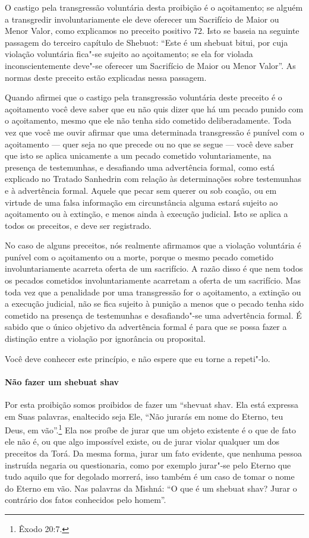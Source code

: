 \begin{multicols}{2}
O castigo pela transgressão voluntária desta proibição é o açoitamento; se alguém a transgredir involuntariamente ele deve oferecer um
Sacrifício de Maior ou Menor Valor, como explicamos no preceito
positivo 72. Isto se baseia na seguinte passagem do terceiro capítulo de
Shebuot\starr: ``Este é um shebuat bitui\starr, por cuja violação voluntária
fica"-se sujeito ao açoitamento; se ela for violada inconscientemente
deve"-se oferecer um Sacrifício de Maior ou Menor Valor''. As normas
deste preceito estão explicadas nessa passagem.

Quando afirmei que o castigo pela transgressão voluntária deste preceito
é o açoitamento você deve saber que eu não quis dizer que há um pecado
punido com o açoitamento, mesmo que ele não tenha sido cometido
deliberadamente. Toda vez que você me ouvir afirmar que uma determinada
transgressão é punível com o açoitamento --- quer seja no que precede
ou no que se segue --- você deve saber que isto se aplica unicamente a
um pecado cometido voluntariamente, na presença de testemunhas, e
desafiando uma advertência formal, como está explicado no Tratado
Sanhedrin\starr{} com relação às determinações sobre testemunhas e à
advertência formal. Aquele que pecar sem querer ou sob coação, ou em
virtude de uma falsa informação em circunstância alguma estará sujeito
ao açoitamento ou à extinção, e menos ainda à execução judicial. Isto
se aplica a todos os preceitos, e deve ser registrado.

No caso de alguns preceitos, nós realmente afirmamos que a violação
voluntária é punível com o açoitamento ou a morte, porque o mesmo
pecado cometido involuntariamente acarreta oferta de um sacrifício. A
razão disso é que nem todos os pecados cometidos involuntariamente
acarretam a oferta de um sacrifício. Mas toda vez que a penalidade por
uma transgressão for o açoitamento, a extinção ou a execução judicial,
não se fica sujeito à punição a menos que o pecado tenha sido cometido
na presença de testemunhas e desafiando"-se uma advertência formal. É
sabido que o único objetivo da advertência formal é para que se possa
fazer a distinção entre a violação por ignorância ou proposital.

Você deve conhecer este princípio, e não espere que eu torne a repeti"-lo.

\paragraph{Não fazer um shebuat shav\starr}

Por esta proibição somos proibidos de fazer um ``shevuat shav\starr.
Ela está expressa em Suas palavras, enaltecido seja
Ele, ``Não jurarás em nome do Eterno, teu Deus, em vão''.\footnote{Êxodo 20:7.}
Ela nos proíbe de jurar que um objeto existente é o que de fato ele não
é, ou que algo impossível existe, ou de jurar violar qualquer um dos
preceitos da Torá\starr. Da mesma forma, jurar um fato evidente, que nenhuma
pessoa instruída negaria ou questionaria, como por exemplo jurar"-se
pelo Eterno que tudo aquilo que for degolado morrerá, isso também é um
caso de tomar o nome do Eterno em vão. Nas palavras da Mishná\starr: ``O que é
um shebuat shav\starr? Jurar o contrário dos fatos conhecidos pelo homem''.


\end{multicols}
